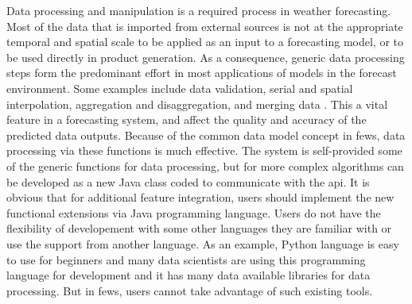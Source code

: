 Data processing and manipulation is a required process in weather forecasting. Most of the data that is imported from external sources is not at the appropriate temporal and spatial scale to be applied as an input to a forecasting model, or to be used directly in product generation. As a consequence, generic data processing steps form the predominant effort in most applications of models in the forecast environment. Some examples include data validation, serial and spatial interpolation, aggregation and disaggregation, and merging data \cite{Werner2013TheSystem}. This a vital feature in a forecasting system, and affect the quality and accuracy of the predicted data outputs. Because of the common data model concept in \acrshort{fews}, data processing via these functions is much effective. The system is self-provided some of the generic functions for data processing, but for more complex algorithms can be developed as a new Java class coded to communicate with the \acrfull{api}. It is obvious that for additional feature integration, users should implement the new functional extensions via Java programming language. Users do not have the flexibility of developement with some other languages they are familiar with or use the support from another language. As an example, Python language is easy to use for beginners and many data scientists are using this programming language for development and it has many data available libraries for data processing. But in \acrshort{fews}, users cannot take advantage of such existing tools.

